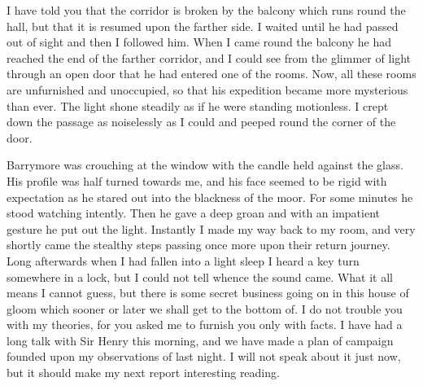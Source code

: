 I have told you that the corridor is broken by the balcony which runs round the hall, but that it is resumed upon the farther side. I waited until he had passed out of sight and then I followed him. When I came round the balcony he had reached the end of the farther corridor, and I could see from the glimmer of light through an open door that he had entered one of the rooms. Now, all these rooms are unfurnished and unoccupied, so that his expedition became more mysterious than ever. The light shone steadily as if he were standing motionless. I crept down the passage as noiselessly as I could and peeped round the corner of the door.

Barrymore was crouching at the window with the candle held against the glass. His profile was half turned towards me, and his face seemed to be rigid with expectation as he stared out into the blackness of the moor. For some minutes he stood watching intently. Then he gave a deep groan and with an impatient gesture he put out the light. Instantly I made my way back to my room, and very shortly came the stealthy steps passing once more upon their return journey. Long afterwards when I had fallen into a light sleep I heard a key turn somewhere in a lock, but I could not tell whence the sound came. What it all means I cannot guess, but there is some secret business going on in this house of gloom which sooner or later we shall get to the bottom of. I do not trouble you with my theories, for you asked me to furnish you only with facts. I have had a long talk with Sir Henry this morning, and we have made a plan of campaign founded upon my observations of last night. I will not speak about it just now, but it should make my next report interesting reading.
